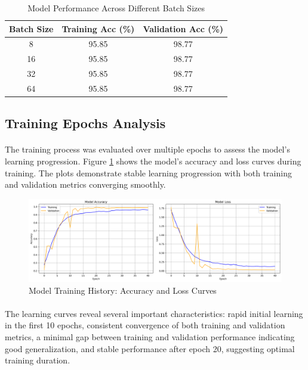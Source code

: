 \begin{table}[h]
    \centering
    \begin{tabular}{|c|c|c|}
        \hline
        \textbf{Batch Size} & \textbf{Training Acc (\%)} & \textbf{Validation Acc (\%)} \\
        \hline
        8 & 95.85 & 98.77 \\
        16 & 95.85 & 98.77 \\
        32 & 95.85 & 98.77 \\
        64 & 95.85 & 98.77 \\
        \hline
    \end{tabular}
    \caption{Model Performance Across Different Batch Sizes}
    \label{tab:batch_size_results}
\end{table}

\subsection{Training Epochs Analysis}
\label{subsec:epochs}

\paragraph{}
The training process was evaluated over multiple epochs to assess the model's learning progression. Figure \ref{fig:training_history} shows the model's accuracy and loss curves during training. The plots demonstrate stable learning progression with both training and validation metrics converging smoothly.

\begin{figure}[h]
    \centering
    \includegraphics[width=\textwidth]{res/images/results/training_history.png}
    \caption{Model Training History: Accuracy and Loss Curves}
    \label{fig:training_history}
\end{figure}

\paragraph{}
The learning curves reveal several important characteristics: rapid initial learning in the first 10 epochs, consistent convergence of both training and validation metrics, a minimal gap between training and validation performance indicating good generalization, and stable performance after epoch 20, suggesting optimal training duration.


